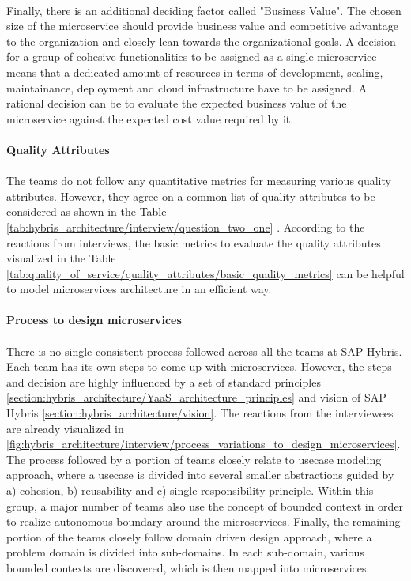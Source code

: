 \\
Finally, there is an additional deciding factor called "Business Value". The chosen size of the microservice should provide business value and competitive advantage to the organization and closely lean towards the organizational goals. A decision for a group of cohesive functionalities to be assigned as a single microservice means that a dedicated amount of resources in terms of development, scaling, maintainance, deployment and cloud infrastructure have to be assigned. A rational decision can be to evaluate the expected business value of the microservice against the expected cost value required by it.
\\
\\
\textbf{Quality Attributes}
\\
\\
The teams do not follow any quantitative metrics for measuring various quality attributes. However, they agree on a common list of quality attributes to be considered as shown in the Table \ref{tab:hybris_architecture/interview/question_two_one} . According to the reactions from interviews, the basic metrics to evaluate the quality attributes visualized in the Table  \ref{tab:quality_of_service/quality_attributes/basic_quality_metrics} can be helpful to model microservices architecture in an efficient way.
\\
\\
\textbf{Process to design microservices}
\\
\\
There is no single consistent process followed across all the teams at SAP Hybris. Each team has its own steps to come up with microservices. However, the steps and decision are highly influenced by a set of  standard principles \ref{section:hybris_architecture/YaaS_architecture_principles} and vision of SAP Hybris \ref{section:hybris_architecture/vision}. The reactions from the interviewees are already visualized in \ref{fig:hybris_architecture/interview/process_variations_to_design_microservices}. 
\\
The process followed by a portion of teams closely relate to usecase modeling approach, where a usecase is divided into several smaller abstractions guided by a) cohesion, b) reusability and c) single responsibility principle. Within this group, a major number of teams also use the concept of bounded context in order to realize autonomous boundary around the microservices. Finally, the remaining portion of the teams closely follow domain driven design approach, where a problem domain is divided into sub-domains. In each sub-domain, various bounded contexts are discovered, which is then mapped into microservices. 

